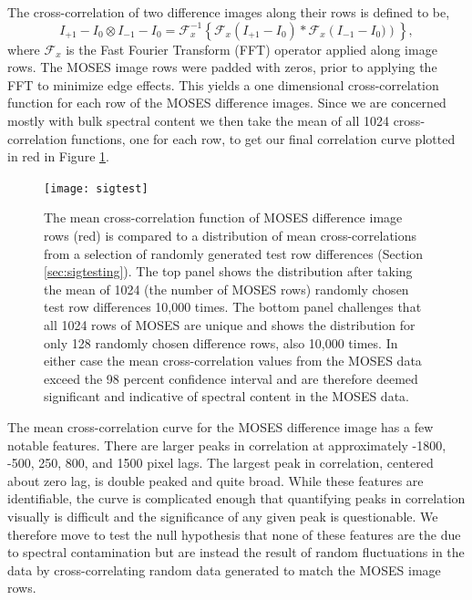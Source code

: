         The cross-correlation of two difference images along their rows is defined to be,
        \begin{equation}
         I_{+1}-I_0 \otimes I_{-1}-I_0 = \mathcal{F}_x^{-1} \left\{\mathcal{F}_x\left(I_{+1}-I_0 \right)*\mathcal{F}_x\left( I_{-1}-I_0) \right)  \right\},
         \label{eqn:cross_correlate}
        \end{equation}
        where $\mathcal{F}_x$ is the Fast Fourier Transform (FFT) operator applied along image rows.
        The MOSES image rows were padded with zeros, prior to applying the FFT to minimize edge effects.   	
        This yields a one dimensional cross-correlation function for each row of the MOSES difference images.  
        Since we are concerned mostly with bulk spectral content we then take the mean of all 1024 cross-correlation functions, one for each row, to get our final correlation curve plotted in red in Figure \ref{fig:sigtest}. 
		 
		 \begin{figure}
		 	\centering
		 	\texttt{[image: sigtest]}
            \caption{The mean cross-correlation function of MOSES difference image rows (red) is compared to a distribution of mean cross-correlations from a selection of randomly generated test row differences (Section \ref{sec:sigtesting}). 
            The top panel shows the distribution after taking the mean of 1024 (the number of MOSES rows) randomly chosen test row differences 10,000 times.  
            The bottom panel challenges that all 1024 rows of MOSES are unique and shows the distribution for only 128 randomly chosen difference rows, also 10,000 times.  
            In either case the mean cross-correlation values from the MOSES data exceed the 98 percent confidence interval and are therefore deemed significant and indicative of spectral content in the MOSES data.}
		 	\label{fig:sigtest}
		 \end{figure}
		 
	 
		 The mean cross-correlation curve for the MOSES difference image has a few notable features.  
		 There are larger peaks in correlation  at approximately -1800, -500, 250, 800, and 1500 pixel lags.  
		 The largest peak in correlation, centered about zero lag, is double peaked and quite broad.   
		 While these features are identifiable, the curve is complicated enough that quantifying peaks in correlation visually is difficult and the significance of any given peak is questionable. 
		 We therefore move to test the null hypothesis that none of these features are the due to spectral contamination but are instead the result of random fluctuations in the data by cross-correlating random data generated to match the MOSES image rows.
 

